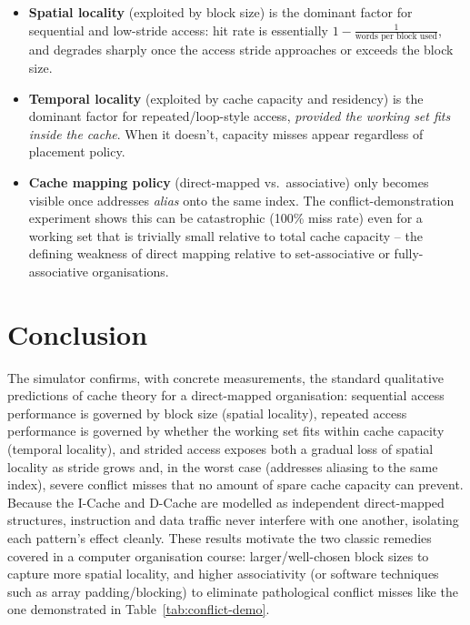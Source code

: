 \documentclass[11pt]{article}
\begin{document}
\begin{itemize}[leftmargin=1.6em]
\item \textbf{Spatial locality} (exploited by block size) is the
      dominant factor for sequential and low-stride access: hit rate
      is essentially $1 - \frac{1}{\text{words per block used}}$, and
      degrades sharply once the access stride approaches or exceeds
      the block size.
\item \textbf{Temporal locality} (exploited by cache capacity and
      residency) is the dominant factor for repeated/loop-style
      access, \emph{provided the working set fits inside the cache}.
      When it doesn't, capacity misses appear regardless of placement
      policy.
\item \textbf{Cache mapping policy} (direct-mapped vs.\ associative)
      only becomes visible once addresses \emph{alias} onto the same
      index. The conflict-demonstration experiment shows this can be
      catastrophic (100\% miss rate) even for a working set that is
      trivially small relative to total cache capacity -- the defining
      weakness of direct mapping relative to set-associative or
      fully-associative organisations.
\end{itemize}

\section{Conclusion}

The simulator confirms, with concrete measurements, the standard
qualitative predictions of cache theory for a direct-mapped
organisation: sequential access performance is governed by block size
(spatial locality), repeated access performance is governed by whether
the working set fits within cache capacity (temporal locality), and
strided access exposes both a gradual loss of spatial locality as
stride grows and, in the worst case (addresses aliasing to the same
index), severe conflict misses that no amount of spare cache capacity
can prevent. Because the I-Cache and D-Cache are modelled as
independent direct-mapped structures, instruction and data traffic
never interfere with one another, isolating each pattern's effect
cleanly. These results motivate the two classic remedies covered in a
computer organisation course: larger/well-chosen block sizes to
capture more spatial locality, and higher associativity (or software
techniques such as array padding/blocking) to eliminate pathological
conflict misses like the one demonstrated in
Table~\ref{tab:conflict-demo}.
\end{document}
